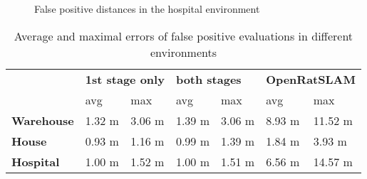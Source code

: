 \begin{figure}[!tbp]
    \centering
    ${}$\\
    ${}$\\
    ${}$\\
    ${}$\\
    ${}$\\
    \hfill
    ${}$\\
    \caption{False positive distances in the hospital environment}
    \label{fig:averageFPErrorHospital}
\end{figure}

\begin{table}[htpb]
    \caption{Average and maximal errors of false positive evaluations in different environments}\label{tab:averageFPError}
    \centering
    \begin{tabular}{l | l  l| l l| l l}
        \toprule
        \textbf{}          & \multicolumn{2}{l|}{\textbf{1st stage only}} & \multicolumn{2}{l|}{\textbf{both stages}} & \multicolumn{2}{l}{\textbf{OpenRatSLAM}}                             \\
        {}                 & avg                                          & max                                       & avg                                      & max    & avg    & max     \\
        \hline
        \textbf{Warehouse} & 1.32 m                                       & 3.06 m                                    & 1.39 m                                   & 3.06 m & 8.93 m & 11.52 m \\
        \textbf{House}     & 0.93 m                                       & 1.16 m                                    & 0.99 m                                   & 1.39 m & 1.84 m & 3.93 m  \\
        \textbf{Hospital}  & 1.00 m                                       & 1.52 m                                    & 1.00 m                                   & 1.51 m & 6.56 m & 14.57 m \\
        \bottomrule
    \end{tabular}
\end{table}

